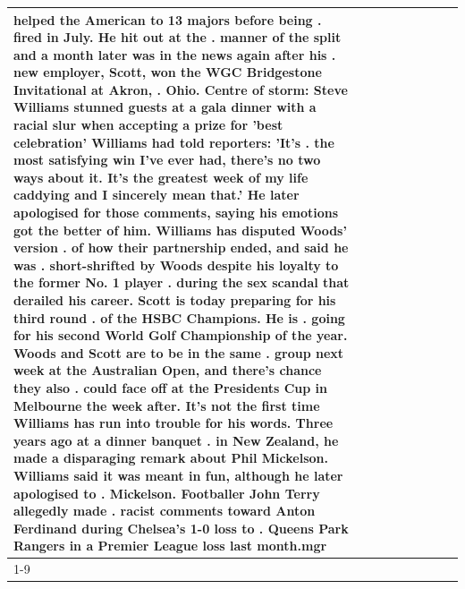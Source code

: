 \begin{table}[H]
\begin{tabular}{lllrlllll}
helped the American to 13 majors before being . fired in July. He hit out at the . manner of the split and a month later was in the news again after his . new employer, Scott, won the WGC Bridgestone Invitational at Akron, . Ohio. Centre of storm: Steve Williams stunned guests at a gala dinner with a racial slur when accepting a prize for 'best celebration' Williams had told reporters: 'It's . the most satisfying win I've ever had, there's no two ways about it. It's the greatest week of my life caddying and I sincerely mean that.' He later apologised for those comments, saying his emotions got the better of him. Williams has disputed Woods' version . of how their partnership ended, and said he was . short-shrifted by Woods despite his loyalty to the former No. 1 player . during the sex scandal that derailed his career. Scott is today preparing for his third round . of the HSBC Champions. He is . going for his second World Golf Championship of the year. Woods and Scott are to be in the same . group next week at the Australian Open, and there's chance they also . could face off at the Presidents Cup in Melbourne the week after. It's not the first time Williams has run into trouble for his words. Three years ago at a dinner banquet . in New Zealand, he made a disparaging remark about Phil Mickelson. Williams said it was meant in fun, although he later apologised to . Mickelson. Footballer John Terry allegedly made . racist comments toward Anton Ferdinand during Chelsea's 1-0 loss to . Queens Park Rangers in a Premier League loss last month.mgr \\
\cline{1-9}

\end{tabular}
\end{table}
